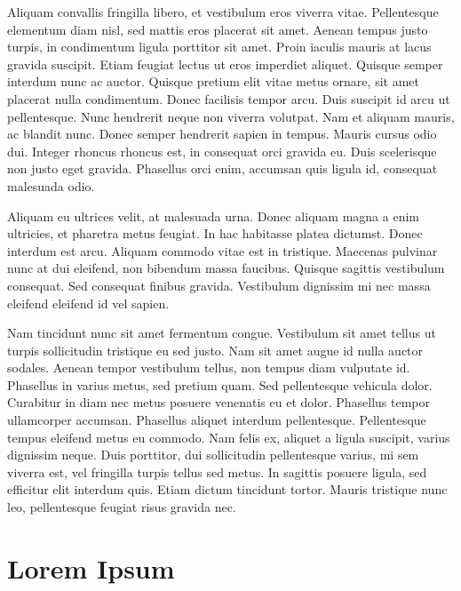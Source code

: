 Aliquam convallis fringilla libero, et vestibulum eros viverra vitae. Pellentesque elementum diam nisl, sed mattis eros placerat sit amet. Aenean tempus justo turpis, in condimentum ligula porttitor sit amet. Proin iaculis mauris at lacus gravida suscipit. Etiam feugiat lectus ut eros imperdiet aliquet. Quisque semper interdum nunc ac auctor. Quisque pretium elit vitae metus ornare, sit amet placerat nulla condimentum. Donec facilisis tempor arcu. Duis suscipit id arcu ut pellentesque. Nunc hendrerit neque non viverra volutpat. Nam et aliquam mauris, ac blandit nunc. Donec semper hendrerit sapien in tempus. Mauris cursus odio dui. Integer rhoncus rhoncus est, in consequat orci gravida eu. Duis scelerisque non justo eget gravida. Phasellus orci enim, accumsan quis ligula id, consequat malesuada odio.

Aliquam eu ultrices velit, at malesuada urna. Donec aliquam magna a enim ultricies, et pharetra metus feugiat. In hac habitasse platea dictumst. Donec interdum est arcu. Aliquam commodo vitae est in tristique. Maecenas pulvinar nunc at dui eleifend, non bibendum massa faucibus. Quisque sagittis vestibulum consequat. Sed consequat finibus gravida. Vestibulum dignissim mi nec massa eleifend eleifend id vel sapien.

Nam tincidunt nunc sit amet fermentum congue. Vestibulum sit amet tellus ut turpis sollicitudin tristique eu sed justo. Nam sit amet augue id nulla auctor sodales. Aenean tempor vestibulum tellus, non tempus diam vulputate id. Phasellus in varius metus, sed pretium quam. Sed pellentesque vehicula dolor. Curabitur in diam nec metus posuere venenatis eu et dolor. Phasellus tempor ullamcorper accumsan. Phasellus aliquet interdum pellentesque. Pellentesque tempus eleifend metus eu commodo. Nam felis ex, aliquet a ligula suscipit, varius dignissim neque. Duis porttitor, dui sollicitudin pellentesque varius, mi sem viverra est, vel fringilla turpis tellus sed metus. In sagittis posuere ligula, sed efficitur elit interdum quis. Etiam dictum tincidunt tortor. Mauris tristique nunc leo, pellentesque feugiat risus gravida nec.

\chapter{Lorem Ipsum}


